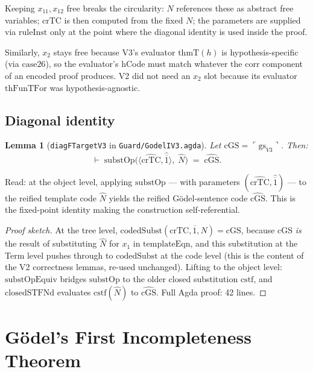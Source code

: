 \documentclass[11pt]{article}
\newtheorem{lemma}[theorem]{Lemma}
\newcommand{\pair}[2]{\langle #1, #2 \rangle}
\newcommand{\nat}[1]{\overline{#1}}
\newcommand{\code}[1]{\ulcorner #1 \urcorner}
\newcommand{\reify}[1]{\widehat{#1}}
\newcommand{\thmT}{\mathrm{thmT}}
\newcommand{\substOp}{\mathrm{substOp}}
\begin{document}
Keeping $x_{11}, x_{12}$ free breaks the circularity: $N$ references
these as abstract free variables; $\mathrm{crTC}$ is then computed
from the fixed $N$; the parameters are supplied via
$\mathrm{ruleInst}$ only at the point where the diagonal identity
is used inside the proof.

Similarly, $x_2$ stays free because V3's evaluator $\thmT(h)$ is
hypothesis-specific (via $\mathrm{case26}$), so the evaluator's
hCode must match whatever the $\mathrm{corr}$ component of an
encoded proof produces.  V2 did not need an $x_2$ slot because its
evaluator $\mathrm{thFunTFor}$ was hypothesis-agnostic.

\subsection{Diagonal identity}

\begin{lemma}[\texttt{diagFTargetV3} in \texttt{Guard/GodelIV3.agda}]
\label{lem:diagFT}
Let $\mathrm{cGS} = \code{\mathrm{gs}_{V3}}$.  Then:
\[
  \vdash \;\substOp\bigl(\pair{\reify{\mathrm{crTC}}}{\reify{\nat{1}}},\;
                    \reify{N}\bigr) \;=\; \reify{\mathrm{cGS}}.
\]
\end{lemma}

Read: at the object level, applying $\substOp$ --- with parameters
$(\reify{\mathrm{crTC}}, \reify{\nat{1}})$ --- to the reified template
code $\reify{N}$ yields the reified G\"odel-sentence code
$\reify{\mathrm{cGS}}$.  This is the fixed-point identity making
the construction self-referential.

\begin{proof}[Proof sketch]
At the tree level, $\mathrm{codedSubst}(\mathrm{crTC}, \nat{1}, N) = \mathrm{cGS}$,
because $\mathrm{cGS}$ \emph{is} the result of substituting
$\reify{N}$ for $x_1$ in $\mathrm{templateEqn}$, and this
substitution at the Term level pushes through to
$\mathrm{codedSubst}$ at the code level (this is the content of
the V2 correctness lemmas, re-used unchanged).
Lifting to the object level:
$\mathrm{substOpEquiv}$ bridges $\substOp$ to the older closed
substitution $\mathrm{cstf}$, and $\mathrm{closedSTFNd}$ evaluates
$\mathrm{cstf}(\reify{N})$ to $\reify{\mathrm{cGS}}$.  Full Agda
proof: 42 lines.
\end{proof}

\section{G\"odel's First Incompleteness Theorem}
\label{sec:godel1}
\end{document}
